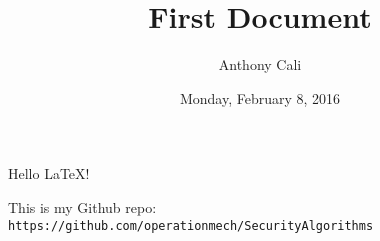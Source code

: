 \documentclass{article}
\title{First Document}
\author{Anthony Cali}
\date{Monday, February 8, 2016}
\begin{document}
    \maketitle
    Hello \LaTeX! \par
    This is my Github repo: {\tt https://github.com/operationmech/SecurityAlgorithms}
  
\end{document}
